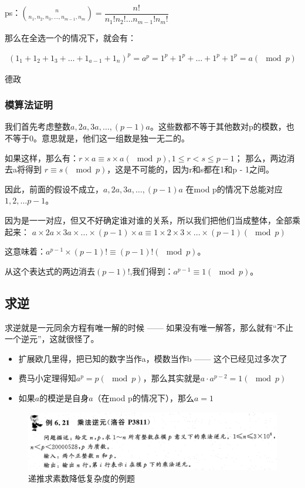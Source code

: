 \documentclass[12pt]{article}
\begin{document}
ps：$\binom{n}{n_{1},n_{2},n_{3},\dots,n_{m-1},n_{m}}=\dfrac{n!}{n_{1}!n_{2}!\dots n_{m-1}!n_{m}!}$

那么在全选一个的情况下，就会有：

\begin{align*}
    (1_{1}+1_{2}+1_{3}+\dots+1_{a-1}+1_{n})^{p}=a^{p}=1^{p}+1^{p}+\dots+1^{p}+1^{p}=a(\mod p)
\end{align*}

德政

\subsubsection{模算法证明}

我们首先考虑整数$a,2a,3a,\dots ,(p - 1)a$。这些数都不等于其他数对p的模数，也不等于0。意思就是，他们这一组数是独一无二的。

如果这样，那么有：$r × a \equiv s × a (\mod p),1 \leq r < s \leq p - 1$；
那么，两边消去a将得到 $r\equiv s(\mod p)$，这是不可能的，因为r和s都在1和p - 1之间。

因此，前面的假设不成立，$a,2a,3a,\dots ,(p - 1)a$ 在mod p的情况下总能对应 $1,2,\dots p - 1$。

因为是一一对应，但又不好确定谁对谁的关系，所以我们把他们当成整体，全部乘起来：
$a × 2a × 3a × ... × (p - 1) × a \equiv 1 × 2 × 3 × ... × (p - 1)(\mod p)$

这意味着：$a^{p-1} × (p - 1)! \equiv (p - 1)!(\mod p)$。

从这个表达式的两边消去$(p - 1)!$,我们得到：$a^{p-1} \equiv 1 (\mod p)$。

\subsection{求逆}

求逆就是一元同余方程有唯一解的时候 —— 如果没有唯一解答，那么就有“不止一个逆元”，这就很怪了。

\begin{itemize}
    \item 扩展欧几里得，把已知的数字当作a，模数当作b —— 这个已经见过多次了
    \item 费马小定理得知$a^{p}=p(\mod p)$，那么其实就是$a\cdot a^{p-2}=1(\mod p)$
    \item 如果$a$的模逆是自身$a$（在mod p的情况下），那么$a=1$
\end{itemize}

\begin{figure}[htb!]
    \centering
    \includegraphics[width=1\textwidth]{./images/6.21.png}
    \caption{递推求素数降低复杂度的例题}
    \label{fig.fig}
\end{figure}
\end{document}
